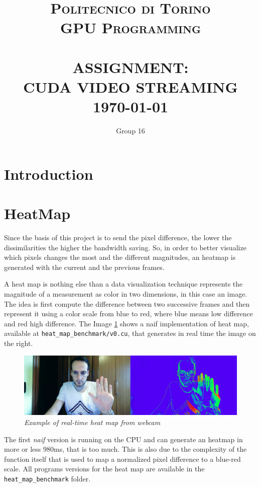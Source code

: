 \documentclass[paper=a4, fontsize=10pt]{scrartcl}	%
\title{	\normalsize \textsc{Politecnico di Torino\\GPU Programming} 	%
	\\[2.0cm]								%
	\HRule{0.5pt} \\						%
	\LARGE \textbf{\uppercase{Assignment:\\CUDA Video Streaming}}	%
	\HRule{2pt} \\ [0.5cm]		%
	\normalsize 
	\today %
}
\author{
	Group 16
}
\makeatletter
\def\printtitle{%
	{\centering \@title\par}}
\def\printauthor{%
	{\centering \large \@author}}
\makeatother
\begin{document}
	\thispagestyle{empty}		%
	
	\printtitle					%
	\vfill
	\printauthor				%
	\newpage
	\setcounter{page}{1}		%
	\section{Introduction}
	
	
	\section{HeatMap}
	Since the basis of this project is to send the pixel difference, the lower the dissimilarities the higher the bandwidth saving. So, in order to better visualize which pixels changes the most and the different magnitudes, an heatmap is generated with the current and the previous frames.
	
	A heat map is nothing else than a data visualization technique represents the magnitude of a measurement as color in two dimensions, in this case an image. The idea is first compute the difference between two successive frames and then represent it using a color scale from blue to red, where blue means low difference and red high difference. The Image \ref{fig:heat_v0} shows a naif implementation of heat map, available at \texttt{heat\_map\_benchmark/v0.cu}, that generates in real time the image on the right.


	\begin{figure}[H]
		\centering
		\includegraphics[width=0.9\linewidth]{images/heatmap/v0}
		\caption{\textit{Example of real-time heat map from webcam}}
		\label{fig:heat_v0}
	\end{figure}
	The first \textit{naif} version is running on the CPU and can generate an heatmap in more or less 980ms, that is too much. This is also due to the complexity of the function itself that is used to map a normalized pixel difference to a blue-red scale.\newline\newline
	All programs versions for the heat map are available in the \texttt{heat\_map\_benchmark} folder.
	
\end{document}
